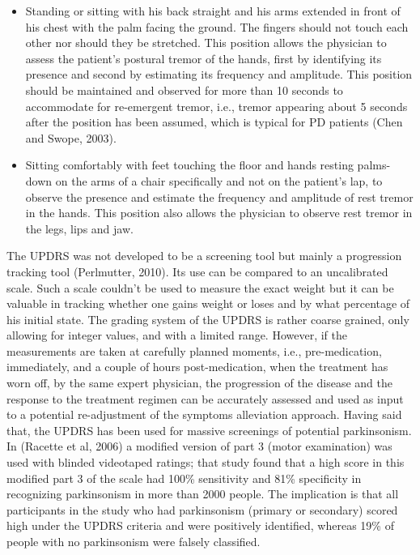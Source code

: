 \begin{itemize}
\item Standing or sitting with his back straight and his arms extended in front of his chest with the palm facing the ground. The fingers should not touch each other nor should they be stretched. This position allows the physician to assess the patient's postural tremor of the hands, first by identifying its presence and second by estimating its frequency and amplitude. This position should be maintained and observed for more than 10 seconds to accommodate for re-emergent tremor, i.e., tremor appearing about 5 seconds after the position has been assumed, which is typical for \gls{PD} patients (Chen and Swope, 2003). 
\item Sitting comfortably with feet touching the floor and hands resting palms-down on the arms of a chair specifically and not on the patient's lap, to observe the presence and estimate the frequency and amplitude of rest tremor in the hands. This position also allows the physician to observe rest tremor in the legs, lips and jaw.
\end{itemize}

The \gls{UPDRS} was not developed to be a screening tool but mainly a progression tracking tool (Perlmutter, 2010). Its use can be compared to an uncalibrated scale. Such a scale couldn't be used to measure the exact weight but it can be valuable in tracking whether one gains weight or loses and by what percentage of his initial state. The grading system of the \gls{UPDRS} is rather coarse grained, only allowing for integer values, and with a limited range. However, if the measurements are taken at carefully planned moments, i.e., pre-medication, immediately, and a couple of hours post-medication, when the treatment has worn off, by the same expert physician, the progression of the disease and the response to the treatment regimen can be accurately assessed and used as input to a potential re-adjustment of the symptoms alleviation approach. Having said that, the \gls{UPDRS} has been used for massive screenings of potential parkinsonism. In (Racette et al, 2006) a modified version of part 3 (motor examination) was used with blinded videotaped ratings; that study found that a high score in this modified part 3 of the scale had 100\% sensitivity and 81\% specificity in recognizing parkinsonism in more than 2000 people. The implication is that all participants in the study who had parkinsonism (primary or secondary) scored high under the \gls{UPDRS} criteria and were positively identified, whereas 19\% of people with no parkinsonism were falsely classified. 


